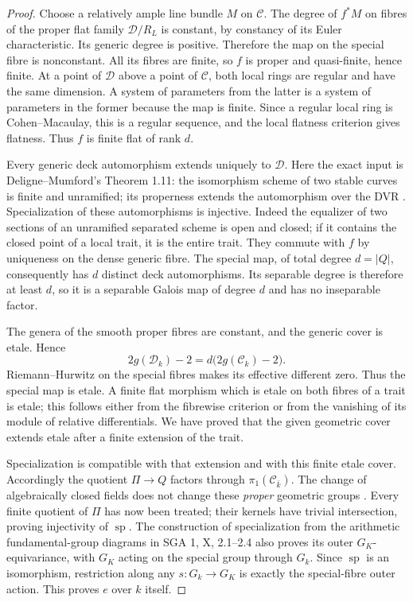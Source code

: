 \begin{proof}
Choose a relatively ample line bundle $M$ on $\mathcal C$. The degree
of $f^*M$ on fibres of the proper flat family $\mathcal D/R_L$ is
constant, by constancy of its Euler characteristic. Its generic degree
is positive. Therefore the map on the special fibre is nonconstant.
All its fibres are finite, so $f$ is proper and quasi-finite, hence finite.
At a point of $\mathcal D$ above a point of $\mathcal C$, both local
rings are regular and have the same dimension. A system of parameters
from the latter is a system of parameters in the former because the
map is finite. Since a regular local ring is Cohen--Macaulay, this is
a regular sequence, and the local flatness criterion gives flatness.
Thus $f$ is finite flat of rank $d$.

Every generic deck automorphism extends uniquely to $\mathcal D$.
Here the exact input is Deligne--Mumford's Theorem 1.11: the isomorphism
scheme of two stable curves is finite and unramified; its properness
extends the automorphism over the DVR
\citep[Theorem 1.11, p.~84]{BC_DM}. Specialization of these automorphisms
is injective. Indeed the equalizer of two sections of an unramified
separated scheme is open and closed; if it contains the closed point
of a local trait, it is the entire trait. They commute with $f$ by
uniqueness on the dense generic fibre. The special map, of total degree
$d=|Q|$, consequently has $d$ distinct deck automorphisms. Its separable
degree is therefore at least $d$, so it is a separable Galois map of
degree $d$ and has no inseparable factor.

The genera of the smooth proper fibres are constant, and the generic
cover is etale. Hence
\[
 2g(\mathcal D_k)-2=d\bigl(2g(\mathcal C_k)-2\bigr).
\]
Riemann--Hurwitz on the special fibres makes its effective different
zero. Thus the special map is etale. A finite flat morphism which is
etale on both fibres of a trait is etale; this follows either from
the fibrewise criterion or from the vanishing of its module of
relative differentials. We have proved that the given geometric cover
extends etale after a finite extension of the trait.

Specialization is compatible with that extension and with this finite
etale cover. Accordingly the quotient $\Pi\to Q$ factors through
$\pi_1(\mathcal C_{\bar k})$. The change of algebraically closed fields
does not change these \emph{proper} geometric groups
\citep[X, Corollary 1.8]{BC_SGA1}. Every finite quotient of $\Pi$ has
now been treated; their kernels have trivial intersection, proving
injectivity of $\operatorname{sp}$. The construction of specialization
from the arithmetic fundamental-group diagrams in SGA 1, X, 2.1--2.4
also proves its outer $G_K$-equivariance, with $G_K$ acting on the
special group through $G_k$. Since $\operatorname{sp}$ is an isomorphism,
restriction along any $s:G_k\to G_K$ is exactly the special-fibre
outer action. This proves $e$ over $k$ itself.


\end{proof}
